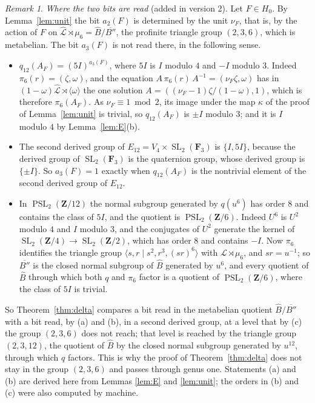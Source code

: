 \documentclass[11pt,a4paper]{article}
\theoremstyle{plain}
\theoremstyle{definition}
\theoremstyle{remark}
\newtheorem{remark}[theorem]{Remark}
\newcommand{\Z}{\mathbf Z}
\newcommand{\F}{\mathbf F}
\newcommand{\Bh}{\widehat B}
\newcommand{\SL}{\operatorname{SL}}
\newcommand{\PSL}{\operatorname{PSL}}
\begin{document}
\begin{remark}\label{rem:a3}
\emph{Where the two bits are read} (added in version 2). Let $F\in H_0$. By Lemma~\ref{lem:unit} the bit $a_2(F)$
is determined by the unit $\nu_F$, that is, by the action of $F$ on
$\widehat{\mathcal L}\rtimes\mu_6=\Bh/\overline{B''}$, the profinite triangle group $(2,3,6)$, which is metabelian.
The bit $a_3(F)$ is not read there, in the following sense.
\begin{itemize}
\item[(a)] $q_{12}(A_F)=(5I)^{a_3(F)}$, where $5I$ is $I$ modulo $4$ and $-I$ modulo $3$. Indeed
$\pi_6(r)=(\zeta,\omega)$, and the equation $A\,\pi_6(r)\,A^{-1}=(\nu_F\zeta,\omega)$ has in
$(1-\omega)\widehat{\mathcal L}\rtimes\langle\omega\rangle$ the one solution $A=((\nu_F-1)\zeta/(1-\omega),1)$,
which is therefore $\pi_6(A_F)$. As $\nu_F\equiv1\bmod2$, its image under the map $\kappa$ of the proof of
Lemma~\ref{lem:unit} is trivial, so $q_{12}(A_F)$ is $\pm I$ modulo $3$; and it is $I$ modulo $4$ by
Lemma~\ref{lem:E}(b).
\item[(b)] The second derived group of $E_{12}=V_4\times\SL_2(\F_3)$ is $\{I,5I\}$, because the derived group of
$\SL_2(\F_3)$ is the quaternion group, whose derived group is $\{\pm I\}$. So $a_3(F)=1$ exactly when $q_{12}(A_F)$
is the nontrivial element of the second derived group of $E_{12}$.
\item[(c)] In $\PSL_2(\Z/12)$ the normal subgroup generated by $q(u^6)$ has order $8$ and contains the class of
$5I$, and the quotient is $\PSL_2(\Z/6)$. Indeed $U^6$ is $U^2$ modulo $4$ and $I$ modulo $3$, and the conjugates of
$U^2$ generate the kernel of $\SL_2(\Z/4)\to\SL_2(\Z/2)$, which has order $8$ and contains $-I$. Now $\pi_6$
identifies the triangle group $\langle s,r\mid s^2,r^3,(sr)^6\rangle$ with $\mathcal L\rtimes\mu_6$, and $sr=u^{-1}$;
so $\overline{B''}$ is the closed normal subgroup of $\Bh$ generated by $u^6$, and every quotient of $\Bh$ through
which both $q$ and $\pi_6$ factor is a quotient of $\PSL_2(\Z/6)$, where the class of $5I$ is trivial.
\end{itemize}
So Theorem~\ref{thm:delta} compares a bit read in the metabelian quotient $\Bh/\overline{B''}$ with a bit read, by
(a) and (b), in a second derived group, at a level that by (c) the group $(2,3,6)$ does not reach; that level is
reached by the triangle group $(2,3,12)$, the quotient of $\Bh$ by the closed normal subgroup generated by $u^{12}$,
through which $q$ factors. This is why the proof of Theorem~\ref{thm:delta} does not stay in the group $(2,3,6)$ and
passes through genus one. Statements (a) and (b) are derived here from Lemmas \ref{lem:E} and \ref{lem:unit}; the
orders in (b) and (c) were also computed by machine.
\end{remark}
\end{document}
